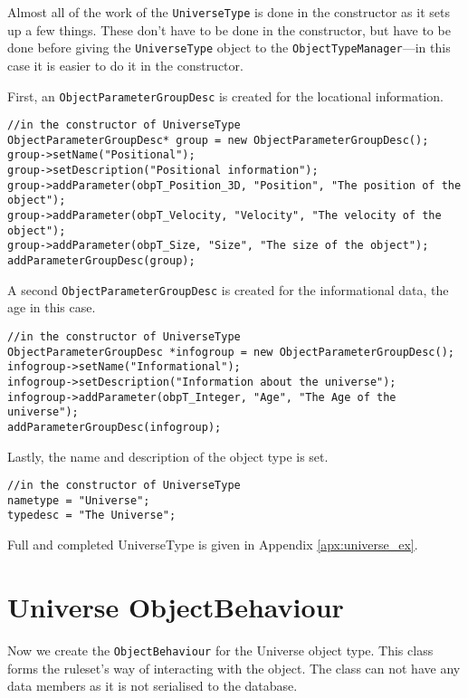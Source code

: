 \documentclass[a4paper,11pt]{report}
\newcommand{\codename}[1]{\texttt{#1}}
\begin{document}
Almost all of the work of the \codename{UniverseType} is done in the constructor as it sets up a few things. These don't have to be done in the constructor, but have to be done before giving the \codename{UniverseType} object to the \codename{ObjectTypeManager}---in this case it is easier to do it in the constructor.

First, an \codename{ObjectParameterGroupDesc} is created for the locational information.

\begin{verbatim}
//in the constructor of UniverseType
ObjectParameterGroupDesc* group = new ObjectParameterGroupDesc();
group->setName("Positional");
group->setDescription("Positional information");
group->addParameter(obpT_Position_3D, "Position", "The position of the object");
group->addParameter(obpT_Velocity, "Velocity", "The velocity of the object");
group->addParameter(obpT_Size, "Size", "The size of the object");
addParameterGroupDesc(group);
\end{verbatim}



A second \codename{ObjectParameterGroupDesc} is created for the informational data, the age in this case.

\begin{verbatim}
//in the constructor of UniverseType
ObjectParameterGroupDesc *infogroup = new ObjectParameterGroupDesc();
infogroup->setName("Informational");
infogroup->setDescription("Information about the universe");
infogroup->addParameter(obpT_Integer, "Age", "The Age of the universe");
addParameterGroupDesc(infogroup);
\end{verbatim}

Lastly, the name and description of the object type is set.

\begin{verbatim}
//in the constructor of UniverseType
nametype = "Universe";
typedesc = "The Universe";
\end{verbatim}

Full and completed UniverseType is given in Appendix \ref{apx:universe_ex}.

\section{Universe ObjectBehaviour}

Now we create the \codename{ObjectBehaviour} for the Universe object type. This class forms the ruleset's way of interacting with the object. The class can not have any data members as it is not serialised to the database.
\end{document}
